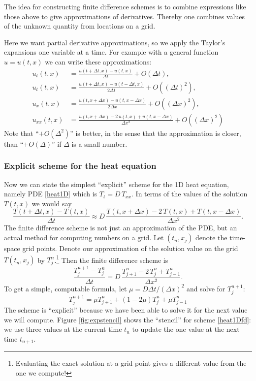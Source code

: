 \documentclass[titlepage,letterpaper,final,12pt]{scrartcl}
\begin{document}
The idea for constructing finite difference schemes is to combine expressions like those above to give approximations of derivatives.  Thereby one combines values of the unknown quantity from  locations on a grid.

Here we want partial derivative approximations, so we apply the Taylor's expansions one variable at a time.  For example with a general function $u=u(t,x)$ we can write these approximations:
\begin{align*}
u_t(t,x) &= \frac{u(t+\Delta t,x) - u(t,x)}{\Delta t} + O(\Delta t), \\
u_t(t,x) &= \frac{u(t+\Delta t,x) - u(t-\Delta t,x)}{2\Delta t} + O((\Delta t)^2), \\
u_x(t,x) &= \frac{u(t,x+\Delta x) - u(t,x-\Delta x)}{2\Delta x} + O((\Delta x)^2), \\
u_{xx}(t,x) &= \frac{u(t,x+\Delta x) - 2\, u(t,x) + u(t,x-\Delta x)}{\Delta x^2} + O((\Delta x)^2)
\end{align*}
Note that ``$+O(\Delta^2)$'' is better, in the sense that the approximation is closer, than ``$+O(\Delta)$'' if $\Delta$ is a small number.

\subsubsection*{Explicit scheme for the heat equation}  Now we can state the simplest ``explicit'' scheme for the 1D heat equation, namely PDE \eqref{heat1D} which is $T_t = D\, T_{xx}$.  In terms of the values of the solution $T(t,x)$ we would say
	$$\frac{T(t+\Delta t,x) - T(t,x)}{\Delta t} \approx D\,\frac{T(t,x+\Delta x) - 2\, T(t,x) + T(t,x-\Delta x)}{\Delta x^2}.$$
The finite difference scheme is not just an approximation of the PDE, but an actual method for computing numbers on a grid.  Let $(t_n,x_j)$ denote the time-space grid points.  Denote our approximation of the solution value on the grid $T(t_n,x_j)$ by $T_j^n$.\footnote{Evaluating the exact solution at a grid point gives a different value from the one we compute!}  Then the finite difference scheme is
	$$\frac{T_j^{n+1} - T_j^n}{\Delta t} = D\,\frac{T_{j+1}^n - 2\, T_j^n + T_{j-1}^n}{\Delta x^2}.$$
To get a simple, computable formula, let $\mu = D \Delta t / (\Delta x)^2$ and solve for $T_j^{n+1}$:
\begin{equation}
  T_j^{n+1} = \mu T_{j+1}^n + (1 - 2 \mu) T_j^n + \mu T_{j-1}^n \label{heat1Dfd}
\end{equation}
The scheme is ``explicit'' because we have been able to solve it for the next value we will compute.  Figure \ref{fig:expstencil} shows the ``stencil'' for scheme \eqref{heat1Dfd}: we use three values at the current time $t_n$ to update the one value at the next time $t_{n+1}$.
\end{document}
